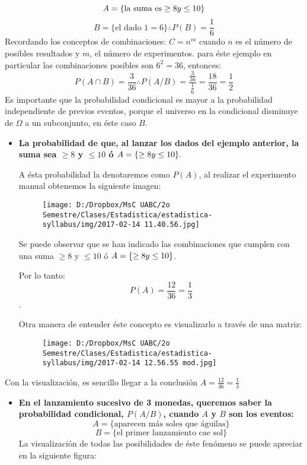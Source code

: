 \documentclass[]{book}
\providecommand{\tightlist}{%
  \setlength{\itemsep}{0pt}\setlength{\parskip}{0pt}}
\begin{document}
\[A = \{\text{la suma es}\geq 8 \space y \space \leq 10\}\]
\[B = \{\text{el dado 1}=6 \} \therefore P(B) = \frac {1}{6}\]
Recordando los conceptos de combinaciones: \(C = n^m\) cuando \(n\) es
el número de posibles resultados y \(m\), el número de experimentos.
para éste ejemplo en particular las combinaciones posibles son
\(6^2 = 36\), entonces:
\[P(A\cap B) = \frac {3}{36} \therefore P(A/B) = \frac {\frac {3}{36}}{\frac {1}{6}} = \frac {18}{36} = \frac {1}{2}\]
Es importante que la probabilidad condicional es mayor a la probabilidad
independiente de previos eventos, porque el universo en la condicional
disminuye de \(\Omega\) a un subconjunto, en éste caso \(B\).

\begin{itemize}
\item
  \textbf{La probabilidad de que, al lanzar los dados del ejemplo
  anterior, la suma sea \(\geq 8\) y \(\leq 10\) ó
  \(A = \{\geq 8 \space y \space \leq 10\}.\)}

  A ésta probabilidad la denotaremos como \(P(A)\), al realizar el
  experimento manual obtenemos la siguiente imagen:

  \begin{figure}[htbp]
  \centering
  \texttt{[image: D:/Dropbox/MsC UABC/2o Semestre/Clases/Estadistica/estadistica-syllabus/img/2017-02-14 11.40.56.jpg]}
  \caption{}
  \end{figure}

   Se puede observar que se han indicado las combinaciones que cumplen
  con una suma \(\geq 8\) y \(\leq 10\) ó
  \(A = \{\geq 8 \space y \space \leq 10\}\).

  Por lo tanto: \[P(A) = \frac {12}{36} = \frac {1}{3}\].

  Otra manera de entender éste concepto es visualizarlo a través de una
  matriz:

  \begin{figure}[htbp]
  \centering
  \texttt{[image: D:/Dropbox/MsC UABC/2o Semestre/Clases/Estadistica/estadistica-syllabus/img/2017-02-14 12.56.55 mod.jpg]}
  \caption{}
  \end{figure}
\end{itemize}

Con la visualización, es sencillo llegar a la conclusión
\(A = \frac {12}{36} = \frac {1}{3}\)

\begin{itemize}
\tightlist
\item
  \textbf{En el lanzamiento sucesivo de 3 monedas, queremos saber la
  probabilidad condicional, \(P(A/B)\), cuando \(A\) y \(B\) son los
  eventos:} \[A = \{\text{aparecen más soles que águilas}\}\]
  \[B = \{\text{el primer lanzamiento cae sol}\}\] La visualización de
  todas las posibilidades de éste fenómeno se puede apreciar en la
  siguiente figura:
\end{itemize}
\end{document}
